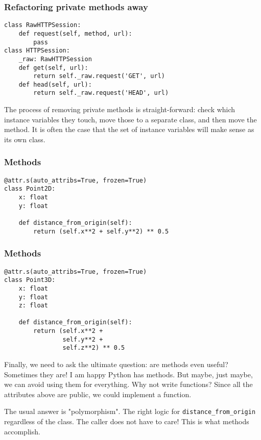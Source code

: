 \begin{frame}[fragile]
\frametitle{Refactoring private methods away}

\begin{lstlisting}
class RawHTTPSession:
    def request(self, method, url):
        pass
class HTTPSession:
    _raw: RawHTTPSession
    def get(self, url):
        return self._raw.request('GET', url)
    def head(self, url):
        return self._raw.request('HEAD', url)
\end{lstlisting}
    
\end{frame}

The process of removing private methods is straight-forward:
check which instance variables they touch,
move those to a separate class,
and then move the method.
It is often the case that the set of instance variables
will
make sense as its own class.

\begin{frame}[fragile]
\frametitle{Methods}

\begin{lstlisting}
@attr.s(auto_attribs=True, frozen=True)
class Point2D:
    x: float
    y: float

    def distance_from_origin(self):
        return (self.x**2 + self.y**2) ** 0.5
\end{lstlisting}

\end{frame}

\begin{frame}[fragile]
\frametitle{Methods}

\begin{lstlisting}
@attr.s(auto_attribs=True, frozen=True)
class Point3D:
    x: float
    y: float
    z: float

    def distance_from_origin(self):
        return (self.x**2 +
                self.y**2 +
                self.z**2) ** 0.5
\end{lstlisting}

\end{frame}

Finally,
we need to ask the ultimate question:
are methods even useful?
Sometimes they are!
I am happy Python has methods.
But maybe,
just maybe,
we can avoid using them for everything.
Why not write functions?
Since all the attributes above are public,
we could implement a function.

The usual answer is "polymorphism".
The right logic for \lstinline!distance_from_origin!
regardless of the class.
The caller does not have to care!
This is what methods accomplish.

